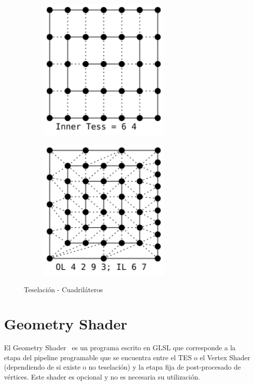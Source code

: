 \begin{figure}
\begin{subfigure}{0.40\textwidth}
	\end{subfigure}
	\hfill
	\begin{subfigure}{0.40\textwidth}
			\includegraphics[height=7cm,width=\textwidth]{figures/QuadInnerOnlyLineCorr.png}	
	\end{subfigure}
	\newline
	\begin{subfigure}{0.40\textwidth}
			\includegraphics[height=7cm,width=\textwidth]{figures/QuadFull.png}	
	\end{subfigure}
	\caption{Teselación - Cuadriláteros}
	\label{fig:quadtessellation}
\end{figure}

\section{Geometry Shader}
\label{ref:GeoShader}

El Geometry Shader~\cite{GeoShader} es un programa escrito en GLSL que
corresponde a la etapa del pipeline programable que se encuentra entre el TES o
el Vertex Shader (dependiendo de si existe o no teselación) y la etapa fija de
post-procesado de vértices. Este shader es opcional y no es necesaria su
utilización.\\

